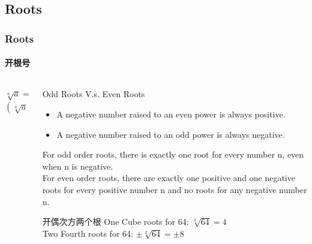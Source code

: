 \documentclass[
	11pt, %
]{beamer}
\begin{document}
\subsection{Roots}
\begin{frame}
\frametitle{Roots}
\framesubtitle{开根号}

	\begin{columns}[c] %

		\begin{column}{0.3\textwidth} %
		\begin{equation*}
			\sqrt[n]{a} = a^{\frac{1}{n}}
		\end{equation*}
		\bigskip
		\begin{equation*}
			(\sqrt[n]{a})^n = a
		\end{equation*}
		\end{column}

				\begin{column}{0.7\textwidth} %
					\begin{alertblock}{Odd Roots V.s. Even Roots}
					\begin{itemize}
							\item A negative number raised to an even power is always positive.
							\item A negative number raised to an odd power is always negative. 
					\end{itemize}
					For odd order roots, there is exactly one root for every number n, even when n is negative. \\
					For even order roots, there are exactly one positive and one negative roots for every positive number n and \alert{no roots for any negative number n}.
				 \end{alertblock}

					\begin{exampleblock}{开偶次方两个根}
						One Cube roots for 64: $\sqrt[3]{64} = 4$ \\
						Two Fourth roots for 64: $\pm \sqrt[2]{64} = \pm 8$
					\end{exampleblock}

		\end{column}
	\end{columns}
	
\end{frame}
\end{document}
